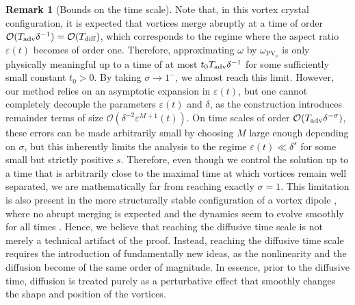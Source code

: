 \documentclass[11pt,reqno,a4paper]{amsart}
\def\eps{\varepsilon}
\newcommand{\cO}{\mathcal{O}}
\newcommand{\1}{\mathbbm{1}}
\theoremstyle{definition}
\newtheorem{remark}[proposition]{Remark}
\theoremstyle{definition}
\numberwithin{equation}{section}
\begin{document}
\begin{remark}[Bounds on the time scale]
Note that, in this vortex crystal configuration, it is expected that vortices merge abruptly at a time of order $\cO( T_{\rm adv} \delta^{-1} )=\cO( T_{\rm diff} )$, which corresponds to the regime where the aspect ratio $\eps(t)$ becomes of order one. Therefore, approximating $\omega$ by $\omega_{\mathrm{PV}_\nu}$ is only physically meaningful up to a time of at most $t_0 T_{\rm adv}\delta^{-1}$ for some sufficiently small constant $t_0>0$. By taking $\sigma \to 1^-$, we almost reach this  limit. However, our method relies on an asymptotic expansion in $\eps(t)$, but  one cannot completely decouple the parameters $\eps(t)$ and $\delta$, as the construction introduces remainder terms of size $\cO(\delta^{-2}\eps^{M+1}(t))$. On time scales of order $\cO(T_{\rm adv}\delta^{-\sigma})$, these errors can be made arbitrarily small by choosing $M$ large enough depending on $\sigma$, but this inherently limits the analysis to the regime $\eps(t) \ll \delta^s$ for some small but strictly positive $s$. Therefore, even though we control the solution up to a time that is arbitrarily close to the maximal time at which vortices remain well separated, we are mathematically far from reaching exactly $\sigma = 1$. This limitation is also present in the more structurally stable configuration of a vortex dipole \cite{dolce2024long}, where no abrupt merging is expected and the dynamics seem to evolve smoothly for all times \cite{DelRos2009}. Hence, we believe that reaching the diffusive time scale is not merely a technical artifact of the proof. Instead, reaching the diffusive time scale requires the introduction of fundamentally new ideas, as the nonlinearity and the diffusion become of the same order of magnitude. In essence, prior to the diffusive time, diffusion is treated purely as a perturbative effect that smoothly changes the shape and position of the vortices.
\end{remark}
\end{document}
